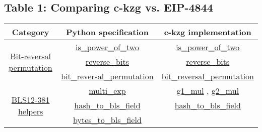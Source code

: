 \documentclass[12pt]{galois-whitepaper}
\begin{document}
\subsection{Table 1: Comparing c-kzg vs. EIP-4844}
\begin{center}
    \begin{tabular}{ |c|c|c| }
        \hline
        \textbf{Category} & \textbf{Python specification} & \textbf{c-kzg implementation} \\ 
        \hline
        \multirow{3}{10em}{\href{https://github.com/ethereum/consensus-specs/blob/dev/specs/deneb/polynomial-commitments.md\#bit-reversal-permutation}{Bit-reversal permutation}}
            & \href{https://github.com/ethereum/consensus-specs/blob/dev/specs/deneb/polynomial-commitments.md\#is_power_of_two}{is\_power\_of\_two}
            & \href{https://github.com/ethereum/c-kzg-4844/blob/main/src/common/utils.c\#L35}{is\_power\_of\_two} \\
            & \href{https://github.com/ethereum/consensus-specs/blob/dev/specs/deneb/polynomial-commitments.md\#reverse_bits}{reverse\_bits} 
            & \href{https://github.com/ethereum/c-kzg-4844/blob/main/src/common/utils.c\#L64}{reverse\_bits} \\
            & \href{https://github.com/ethereum/consensus-specs/blob/dev/specs/deneb/polynomial-commitments.md\#bit_reversal_permutation}{bit\_reversal\_permutation}
            & \href{https://github.com/ethereum/c-kzg-4844/blob/main/src/common/utils.c\#L102}{bit\_reversal\_permutation} \\
        \hline
        \multirow{14}{10em}{\href{https://github.com/ethereum/consensus-specs/blob/dev/specs/deneb/polynomial-commitments.md\#bls12-381-helpers}{BLS12-381 helpers}}
            & \href{https://github.com/ethereum/consensus-specs/blob/dev/specs/deneb/polynomial-commitments.md\#multi_exp}{multi\_exp}
            & \href{https://github.com/ethereum/c-kzg-4844/blob/main/src/common/ec.c\#L42}{g1\_mul}
            , \href{https://github.com/ethereum/c-kzg-4844/blob/main/src/eip4844/eip4844.c\#L124}{g2\_mul}\\
            & \href{https://github.com/ethereum/consensus-specs/blob/dev/specs/deneb/polynomial-commitments.md\#hash_to_bls_field}{hash\_to\_bls\_field}
            & \href{https://github.com/ethereum/c-kzg-4844/blob/main/src/common/bytes.c\#L123}{hash\_to\_bls\_field}\\
            & \href{https://github.com/ethereum/consensus-specs/blob/dev/specs/deneb/polynomial-commitments.md\#bytes_to_bls_field}{bytes\_to\_bls\_field}

\end{tabular}
\end{center}
\end{document}
